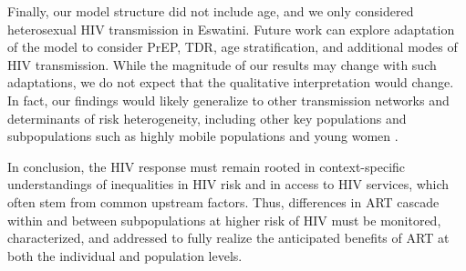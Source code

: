 Finally, our model structure did not include age,
and we only considered heterosexual HIV transmission in Eswatini.
Future work can explore adaptation of the model to consider
PrEP, TDR, age stratification, and additional modes of HIV transmission.
While the magnitude of our results may change with such adaptations,
we do not expect that the qualitative interpretation would change.
In fact, our findings would likely generalize
to other transmission networks and determinants of risk heterogeneity,
including other key populations and subpopulations such as
highly mobile populations and young women \cite{Camlin2019,Cheuk2020}.
\par\pagebreak %
In conclusion, the HIV response must remain rooted in
context-specific understandings of inequalities in HIV risk and in access to HIV services,
which often stem from common upstream factors.
Thus, differences in ART cascade within and between subpopulations at higher risk of HIV
must be monitored, characterized, and addressed
to fully realize the anticipated benefits of ART
at both the individual and population levels.
